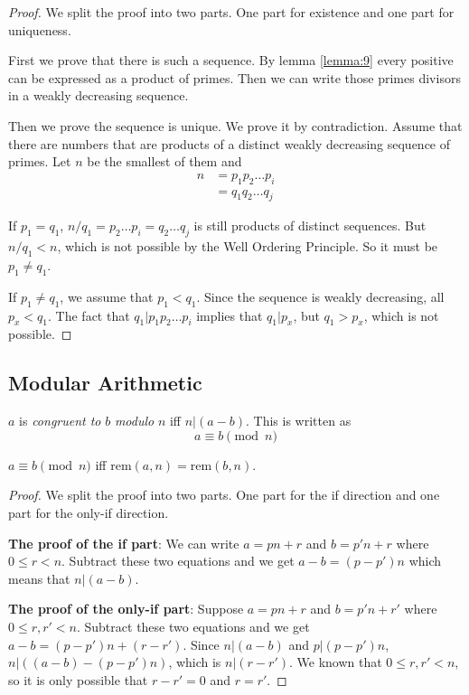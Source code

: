 \documentclass[11pt]{article}
\newcommand{\rem}{\mathrm{rem}}
\begin{document}
\begin{proof}
We split the proof into two parts. One part for existence and one part for uniqueness.

First we prove that there is such a sequence. By lemma \ref{lemma:9} every positive can be
expressed as a product of primes. Then we can write those primes divisors in a weakly
decreasing sequence.

Then we prove the sequence is unique. We prove it by contradiction. Assume that there are numbers that are products of a distinct weakly decreasing sequence of primes. Let $n$ be
the smallest of them and
\begin{align*}
n &= p_1p_2 \dots p_i \\
&= q_1q_2 \dots q_j
\end{align*}

If $p_1 = q_1$, $n/q_1 = p_2 \dots p_i = q_2 \dots q_j$ is still products of distinct
sequences. But $n/q_1 < n$, which is not possible by the Well Ordering Principle. So it must
be $p_1 \neq q_1$.

If $p_1 \neq q_1$, we assume that $p_1 < q_1$. Since the sequence is weakly decreasing, all
$p_x < q_1$. The fact that $q_1|p_1p_2 \dots p_i$ implies that $q_1|p_x$, but $q_1 > p_x$,
which is not possible.

\end{proof}

\subsection{Modular Arithmetic}

\begin{definition}
$a$ is \emph{congruent to} $b$ \emph{modulo} $n$ iff $n|(a-b)$. This is written as
$$
a \equiv b \pmod{n}
$$
\end{definition}

\begin{lemma} \label{lemma:12}
$a \equiv b \pmod{n}$ iff $\rem(a, n) = \rem(b,n)$.
\end{lemma}

\begin{proof}
We split the proof into two parts. One part for the if direction and one part for the
only-if direction.

\textbf{The proof of the if part}: We can write $a = pn + r$ and $b = p'n + r$ where
$0 \leq r < n$. Subtract these two equations and we get $a - b = (p - p')n$ which means
that $n|(a-b)$.

\textbf{The proof of the only-if part}: Suppose $a=pn+r$ and $b=p'n+r'$ where
$0 \leq r,r' < n$. Subtract these two equations and we get $a-b=(p-p')n+(r-r')$. Since
$n|(a-b)$ and $p|(p-p')n$, $n|((a-b)-(p-p')n)$, which is $n|(r-r')$. We known that
$0 \leq r,r' < n$, so it is only possible that $r-r'=0$ and $r=r'$.

\end{proof}
\end{document}
